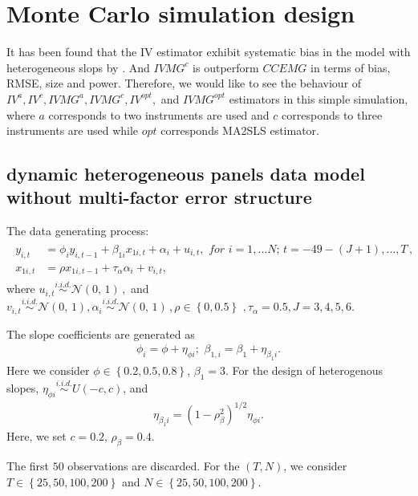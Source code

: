\documentclass[12pt,a4paper,hyperref]{article}
\begin{document}
\section{Monte Carlo simulation design}
It has been found that the IV estimator exhibit systematic bias in the model with heterogeneous slops by \citet{Norkute:2019}. And $IVMG^{c}$ is outperform $CCEMG$ in terms of bias, RMSE, size and power.
Therefore, we would like to see the behaviour of $IV^{a}, IV^{c}, IVMG^{a}, IVMG^{c}, IV^{opt},$ and $IVMG^{opt} $ estimators in this simple simulation, where $a$ corresponds to two instruments are used and $c$  corresponds to three instruments are used while $opt$ corresponds MA2SLS estimator.

\subsection{dynamic heterogeneous panels data model without multi-factor error structure}
The data generating process:
\begin{align}
\begin{split}
y_{i,t}&= \phi_{i} y_{i,t-1}+\beta_{1 i}x_{1 i,t}+\alpha_{i}+u_{i,t}, \,\, for\,\,i=1,\ldots N;\,t=-49-(J+1),\ldots,T\, , \\ \label{M1}
x_{1 i,t}&=\rho x_{1 i,t-1}+\tau_{\alpha} \alpha_{i} +v_{i,t},
\end{split}
\end{align}
where $u_{i,t}\overset{i.i.d.}{\sim} \mathcal{N}(0,\,1)\,,$ and $v_{ i,t}\overset{i.i.d.}{\sim} \mathcal{N}(0,\,1), \alpha_{i}\overset{i.i.d.}{\sim} \mathcal{N}(0,\,1) \, ,\rho \in \left\{0, 0.5  \right\}  \, \, ,\tau_{\alpha}=0.5, J=3,4,5,6.$

The slope coefficients are generated as
\begin{align}
\phi_{i}=\phi+\eta_{\phi i};\,\, \beta_{1,i}=\beta_{1}+\eta_{\beta_{1} i}.
\end{align}
Here we consider $\phi \in \left\{0.2, 0.5, 0.8 \right\}$, $\beta_{1}=3$. For the design of heterogenous slopes, $\eta_{\phi i} \overset{i.i.d.}{\sim} U\left( -c, c\right)$, and
\begin{align}
\eta_{\beta_{1} i}= \left(1-\rho^{2}_{\beta}  \right)^{1/2}\eta_{\phi i}.
\end{align}
Here, we set $c=0.2,\, \rho_{\beta}=0.4.$


 The first $50$ observations are discarded. For the $(T,N)$, we consider $T \in \left\{25, 50, 100, 200  \right\}$ and  $N \in \left\{25, 50, 100, 200  \right\}.$
\end{document}
